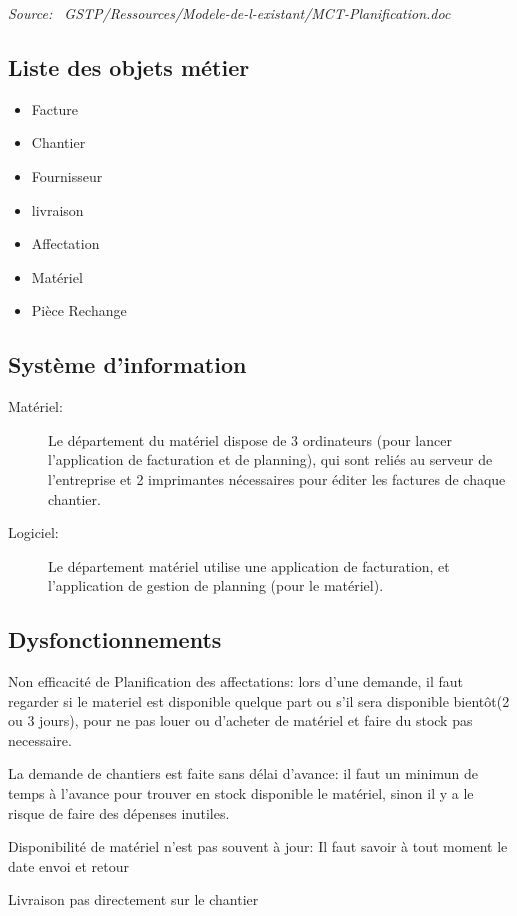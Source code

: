     {\sl Source:~{\ttfamily 
        GSTP/Ressources/Modele-de-l-existant/MCT-Planification.doc}}


\subsection{Liste des objets métier}

    \begin{itemize}
    	\item Facture
    	\item Chantier
    	\item Fournisseur
    	\item livraison
    	\item Affectation
    	\item Matériel
    	\item Pièce Rechange
    \end{itemize}

\subsection{Système d'information}

    \begin{description}
        \item [Matériel:]\el 
            Le département du matériel dispose de 3 ordinateurs (pour lancer
            l'application de facturation et de planning), qui sont reliés au
            serveur de l'entreprise et 2 imprimantes nécessaires pour
            éditer les factures de chaque chantier.

        \item [Logiciel:]
            Le département matériel utilise une application de facturation,
            et l'application de gestion de planning (pour le matériel).
    \end{description}

\subsection{Dysfonctionnements}


Non efficacité de Planification des affectations: lors d'une demande, il faut regarder si le materiel est disponible quelque part ou s'il sera disponible bientôt(2 ou 3 jours), pour ne pas louer ou d'acheter de matériel et faire du stock pas necessaire.

La demande de chantiers est faite sans délai d'avance: il faut un minimun de temps à l'avance pour trouver en stock disponible le matériel, sinon il y a le risque de faire des dépenses inutiles.

Disponibilité de matériel n'est pas souvent à jour: Il faut savoir à tout moment le date envoi et retour

Livraison pas directement sur le chantier
